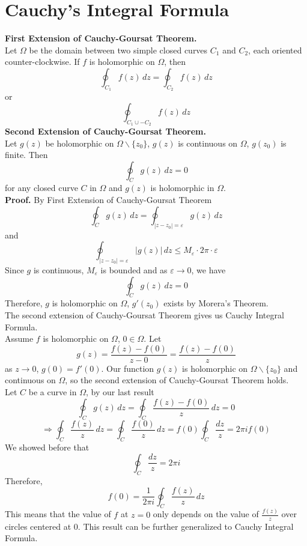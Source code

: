 \documentclass[11pt]{article}
\begin{document}
\section{Cauchy's Integral Formula}
\textbf{First Extension of Cauchy-Goursat Theorem.} \\
Let $\Omega$ be the domain between two simple closed curves $C_1$ and $C_2$, each oriented counter-clockwise. If $f$ is holomorphic on $\Omega$, then 
$$ \oint_{C_1}f(z) \,dz = \oint_{C_2}f(z) \,dz $$
or
$$\oint_{C_1 \cup -C_2}f(z) \, dz$$
\newline
\newline
\textbf{Second Extension of Cauchy-Goursat Theorem. } \\
Let $g(z)$ be holomorphic on $\Omega \backslash \{z_0\}$, $g(z)$ is continuous on $\Omega$, $g(z_0)$ is finite. Then
$$\oint_C g(z) \,dz = 0$$
for any closed curve $C$ in $\Omega$ and $g(z)$ is holomorphic in $\Omega$. \\
\textbf{Proof.} By First Extension of Cauchy-Goursat Theorem 
$$\oint_C g(z) \,dz = \oint_{|z - z_0| = \varepsilon} g(z) \, dz$$
and 
$$\oint_{|z - z_0| = \varepsilon} |g(z)| \, dz \leqslant M_{\varepsilon}\cdot 2\pi \cdot \varepsilon$$
Since $g$ is continuous, $M_\varepsilon$ is bounded and as $\varepsilon \to 0$, we have 
$$\oint_C g(z) \,dz = 0$$
Therefore, $g$ is holomorphic on $\Omega$, $g'(z_0)$ exists by Morera's Theorem. \\
\newline
The second extension of Cauchy-Goursat Theorem gives us Cauchy Integral Formula. \\
Assume $f$ is holomorphic on $\Omega$, $0 \in \Omega$. Let 
$$g(z) = \frac{f(z) - f(0)}{z - 0} = \frac{f(z) - f(0)}{z}$$ 
as $z \to 0$, $g(0) = f'(0)$. Our function $g(z)$ is holomorphic on $\Omega \backslash \{z_0\}$ and continuous on $\Omega$, so the second extension of Cauchy-Goursat Theorem holds. \\
Let $C$ be a curve in $\Omega$, by our last result 
$$\oint_C g(z) \, dz = \oint_C \frac{f(z) - f(0)}{z} \, dz = 0$$
$$\Rightarrow \oint_C \frac{f(z)}{z} \, dz = \oint_C \frac{f(0)}{z} \, dz = f(0)\oint_C \frac{dz}{z} = 2\pi if(0)$$
We showed before that 
$$ \oint_C \frac{dz}{z} = 2\pi i$$
Therefore, 
$$f(0) = \frac{1}{2\pi i} \oint_C \frac{f(z)}{z} \,dz$$
This means that the value of $f$ at $z = 0$ only depends on the value of $\frac{f(z)}{z}$ over circles centered at 0. This result can be further generalized to Cauchy Integral Formula. \\
\newline
\end{document}
